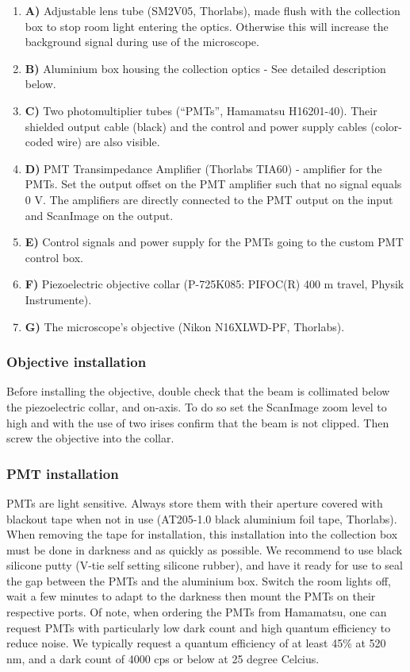 \documentclass[10pt,letterpaper]{article}
\begin{document}
\begin{enumerate}[]
    \item \textbf{A)} Adjustable lens tube (SM2V05, Thorlabs), made flush with the collection box to stop room light entering the optics. Otherwise this will increase the background signal during use of the microscope. 
    \item \textbf{B)} Aluminium box housing the collection optics - See detailed description below.
    \item \textbf{C)} Two photomultiplier tubes (``PMTs'', Hamamatsu H16201-40). Their shielded output cable (black) and the control and power supply cables (color-coded wire) are also visible.
    \item \textbf{D)} PMT Transimpedance Amplifier (Thorlabs TIA60) - amplifier for the PMTs. Set the output offset on the PMT amplifier such that no signal equals 0 V. The amplifiers are directly connected to the PMT output on the input and ScanImage on the output.
    \item \textbf{E)} Control signals and power supply for the PMTs going to the custom PMT control box.
    \item \textbf{F)} Piezoelectric objective collar (P-725K085: PIFOC(R) 400 \textmu m travel, Physik Instrumente).
    \item \textbf{G)} The microscope's objective (Nikon N16XLWD-PF, Thorlabs).
\end{enumerate}
%
\subsubsection{Objective installation}
Before installing the objective, double check that the beam is collimated below the piezoelectric collar, and on-axis. To do so set the ScanImage zoom level to high and with the use of two irises confirm that the beam is not clipped. Then screw the objective into the collar.
 
\subsubsection{PMT installation}
PMTs are light sensitive. Always store them with their aperture covered with blackout tape when not in use (AT205-1.0 black aluminium foil tape, Thorlabs). When removing the tape for installation, this installation into the collection box must be done in darkness and as quickly as possible. We recommend to use black silicone putty (V-tie self setting silicone rubber), and have it ready for use to seal the gap between the PMTs and the aluminium box. Switch the room lights off, wait a few minutes to adapt to the darkness then mount the PMTs on their respective ports. Of note, when ordering the PMTs from Hamamatsu, one can request PMTs with particularly low dark count and high quantum efficiency to reduce noise. We typically request a quantum efficiency of at least 45\% at 520 nm, and a dark count of 4000 cps or below at 25 degree Celcius.
\end{document}
